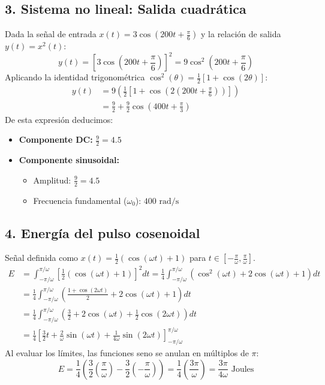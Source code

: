 \documentclass[12pt]{article}
\begin{document}
\subsection*{3. Sistema no lineal: Salida cuadrática}
Dada la señal de entrada $x(t) = 3\cos\left(200t + \frac{\pi}{6}\right)$ y la relación de salida $y(t) = x^2(t)$:
\begin{equation*}
    y(t) = \left[ 3\cos\left(200t + \frac{\pi}{6}\right) \right]^2 = 9\cos^2\left(200t + \frac{\pi}{6}\right)
\end{equation*}
Aplicando la identidad trigonométrica $\cos^2(\theta) = \frac{1}{2}[1 + \cos(2\theta)]$:
\begin{align*}
    y(t) &= 9 \left( \frac{1}{2} \left[ 1 + \cos\left(2\left(200t + \frac{\pi}{6}\right)\right) \right] \right) \\
         &= \frac{9}{2} + \frac{9}{2}\cos\left(400t + \frac{\pi}{3}\right)
\end{align*}
De esta expresión deducimos:
\begin{itemize}
    \item \textbf{Componente DC:} $\frac{9}{2} = 4.5$
    \item \textbf{Componente sinusoidal:} 
    \begin{itemize}
        \item Amplitud: $\frac{9}{2} = 4.5$
        \item Frecuencia fundamental ($\omega_0$): $400 \text{ rad/s}$
    \end{itemize}
\end{itemize}

\subsection*{4. Energía del pulso cosenoidal}
Señal definida como $x(t) = \frac{1}{2}(\cos(\omega t) + 1)$ para $t \in \left[-\frac{\pi}{\omega}, \frac{\pi}{\omega}\right]$.
\begin{align*}
    E &= \int_{-\pi/\omega}^{\pi/\omega} \left[ \frac{1}{2}(\cos(\omega t) + 1) \right]^2 dt = \frac{1}{4} \int_{-\pi/\omega}^{\pi/\omega} (\cos^2(\omega t) + 2\cos(\omega t) + 1) dt \\
      &= \frac{1}{4} \int_{-\pi/\omega}^{\pi/\omega} \left( \frac{1 + \cos(2\omega t)}{2} + 2\cos(\omega t) + 1 \right) dt \\
      &= \frac{1}{4} \int_{-\pi/\omega}^{\pi/\omega} \left( \frac{3}{2} + 2\cos(\omega t) + \frac{1}{2}\cos(2\omega t) \right) dt \\
      &= \frac{1}{4} \left[ \frac{3}{2}t + \frac{2}{\omega}\sin(\omega t) + \frac{1}{4\omega}\sin(2\omega t) \right]_{-\pi/\omega}^{\pi/\omega}
\end{align*}
Al evaluar los límites, las funciones seno se anulan en múltiplos de $\pi$:
\begin{equation*}
    E = \frac{1}{4} \left( \frac{3}{2}\left(\frac{\pi}{\omega}\right) - \frac{3}{2}\left(-\frac{\pi}{\omega}\right) \right) = \frac{1}{4} \left( \frac{3\pi}{\omega} \right) = \frac{3\pi}{4\omega} \text{ Joules}
\end{equation*}
\end{document}
